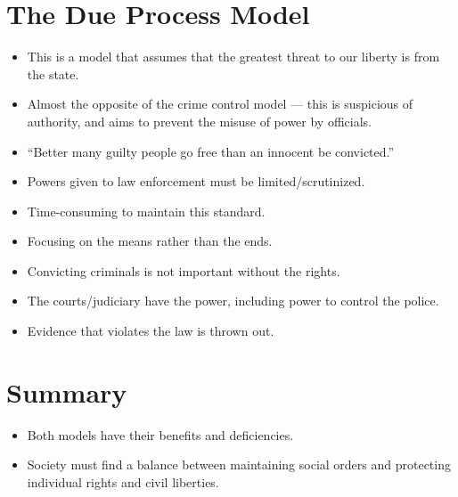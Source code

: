 \documentclass{article}
\begin{document}
\section{The Due Process Model}
\begin{itemize}
    \item This is a model that assumes that the greatest threat to our liberty is from the state.
    \item Almost the opposite of the crime control model --- this is suspicious of authority, and aims to prevent the misuse of power by officials.
    \item ``Better many guilty people go free than an innocent be convicted.''
    \item Powers given to law enforcement must be limited/scrutinized.
    \item Time-consuming to maintain this standard.
    \item Focusing on the means rather than the ends.
    \item Convicting criminals is not important without the rights.
    \item The courts/judiciary have the power, including power to control the police.
    \item Evidence that violates the law is thrown out.
\end{itemize}

\section{Summary}
\begin{itemize}
    \item Both models have their benefits and deficiencies.
    \item Society must find a balance between maintaining social orders and protecting individual rights and civil liberties.
\end{itemize}
\end{document}
